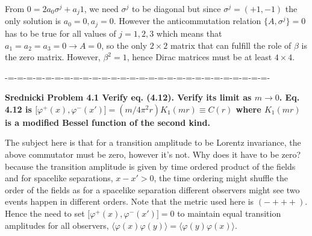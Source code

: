 \documentclass[aps,preprint,preprintnumbers,nofootinbib,showpacs,prd]{revtex4-1}
\begin{document}
From $0 = 2 a_0 \sigma^j + a_j 1$, we need $\sigma^j$ to be diagonal but since $\sigma^j = (+1, -1)$ the only solution is $a_0 = 0, a_j = 0$. However the anticommutation relation $\{A, \sigma^j\} = 0$ has to be true for all values of $j = 1,2,3$ which means that $a_1 = a_2 = a_3 = 0 \rightarrow A = 0$, so the only $2\times2$ matrix that can fulfill the role of $\beta$ is the zero matrix. However, $\beta^2 = 1$, hence Dirac matrices must be at least $4\times4$.

-=-=-=-=-=-=-=-=-=-=-=-=-=-=-=-=-=-=-=-=-=-=-=-=-=-=-=-=-

{\bf Srednicki Problem 4.1 Verify eq. (4.12). Verify its limit as $m \rightarrow 0$. Eq. 4.12 is $\lbrack \varphi^+(x),\varphi^-(x') \rbrack = (m/4\pi^2 r) K_1(mr) \equiv C(r)$ where $K_1(mr)$ is a modified Bessel function of the second kind.}

The subject here is that for a transition amplitude to be Lorentz invariance, the above commutator must be zero, however it's not. Why does it have to be zero? because the transition amplitude is given by time ordered product of the fields and for spacelike separations, $x-x' > 0$, the time ordering might shuffle the order of the fields as for a spacelike separation different observers might see two events happen in different orders. Note that the metric used here is $(-+++)$. Hence the need to set $\lbrack \varphi^+(x),\varphi^-(x') \rbrack = 0$ to maintain equal transition amplitudes for all observers, $\langle \varphi(x) \varphi(y) \rangle = \langle \varphi(y) \varphi(x) \rangle$.
\end{document}
